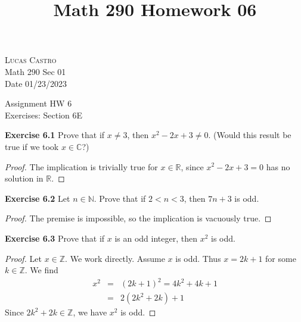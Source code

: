 \documentclass[12pt,oneside]{article}
\newenvironment{exercise}[1]{\vspace{.1in}\noindent\textbf{Exercise #1 \hspace{.05em}}}{}
\newcommand{\R}{\mathbb{R}}
\newcommand{\C}{\mathbb{C}}
\newcommand{\Z}{\mathbb{Z}}
\newcommand{\N}{\mathbb{N}}
\begin{document}
\title{Math 290 Homework 06}

\begin{flushright}
\textsc{Lucas Castro}  \\
Math 290 Sec 01\\
Date 01/23/2023
\end{flushright}

\begin{center}
\textsf{Assignment HW 6} \\
\textsf{Exercises: Section 6E}
\end{center}


\begin{exercise}{6.1}
Prove that if $x \neq 3$, then $x^2 - 2x + 3 \neq 0$. (Would this result be true if we took $x \in \C$?)
\end{exercise}

\begin{proof}
The implication is trivially true for $x \in \R$, since $x^2 - 2x + 3 = 0$ has no solution in $\R$.
\end{proof}



\begin{exercise}{6.2}
Let $n \in \N$. Prove that if $2<n<3$, then $7n + 3$ is odd. 
\end{exercise}

\begin{proof}
The premise is impossible, so the implication is vacuously true.
\end{proof}



\begin{exercise}{6.3}
Prove that if $x$ is an odd integer, then $x^2$ is odd.
\end{exercise}

\begin{proof}
Let $x \in \Z$. We work directly. Assume $x$ is odd. Thus $x = 2k + 1$ for some $k \in \Z$. We find
\begin{eqnarray*}
x^2  &=& (2k + 1)^2 = 4k^2 + 4k + 1 \\
&=& 2(2k^2 + 2k) + 1
\end{eqnarray*}
Since $2k^2 + 2k \in \Z$, we have $x^2$ is odd.
\end{proof}
\end{document}
